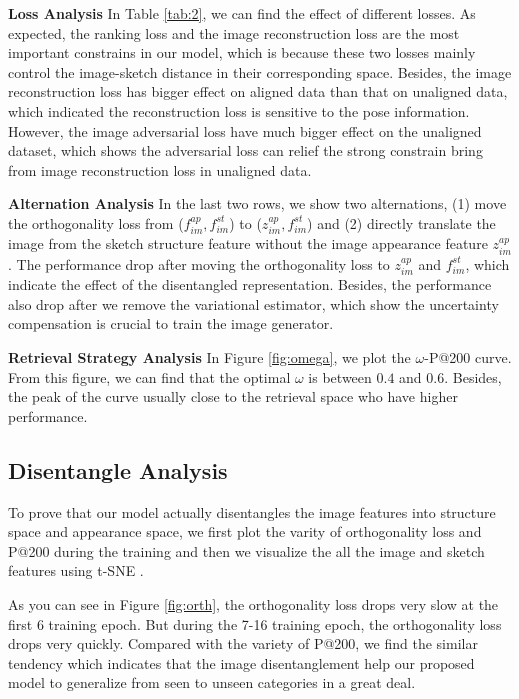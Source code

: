 \documentclass[10pt,twocolumn,letterpaper]{article}
\begin{document}
\noindent\textbf{Loss Analysis}
In Table \ref{tab:2}, we can find the effect of different losses. As expected, the ranking loss and the image reconstruction loss are the most important constrains in our model, which is because these two losses mainly control the image-sketch distance in their corresponding space. Besides, the image reconstruction loss has bigger effect on aligned data than that on unaligned data, which indicated the reconstruction loss is sensitive to the pose information. However, the image adversarial loss have much bigger effect on the unaligned dataset, which shows the adversarial loss can relief the strong constrain bring from image reconstruction loss in unaligned data. 

\noindent\textbf{Alternation Analysis}
In the last two rows, we show two alternations, (1) move the orthogonality loss from ($f_{im}^{ap},f_{im}^{st}$) to ($z_{im}^{ap},f_{im}^{st}$) and (2) directly translate the image from the sketch structure feature without the image appearance feature $z_{im}^{ap}$. The performance drop after moving the orthogonality loss to $z_{im}^{ap}$ and $f_{im}^{st}$, which indicate the effect of the disentangled representation. Besides, the performance also drop after we remove the variational estimator, which show the uncertainty compensation is crucial to train the image generator.

\noindent\textbf{Retrieval Strategy  Analysis}
In Figure \ref{fig:omega}, we plot the $\omega$-P@200 curve. From this figure, we can find that the optimal $\omega$ is between $0.4$ and $0.6$. \color{red}Besides, the peak of the curve usually close to the retrieval space who have higher performance.\color{black}

\subsection{Disentangle Analysis}
To prove that our model actually disentangles the image features into structure space and appearance space, we first plot the varity of orthogonality loss and P@200 during the training and then \color{red}we visualize the all the image and sketch features\color{black} using t-SNE \cite{maaten2008visualizing}.

As you can see in Figure \ref{fig:orth}, the orthogonality loss drops very slow at the first 6 training epoch. But during the 7-16 training epoch, the orthogonality loss drops very quickly. Compared with the variety of P@200, we find the similar tendency which indicates that the image disentanglement help our proposed model to generalize from seen to unseen categories in a great deal.
\end{document}
